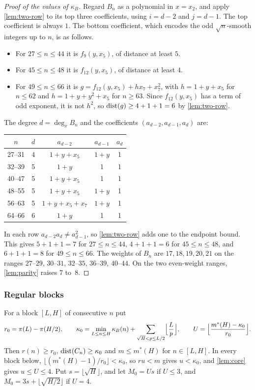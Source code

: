 \begin{proof}[Proof of the values of $\kappa_B$]
Regard $B_n$ as a polynomial in $x=x_2$, and apply \cref{lem:two-row} to its top three coefficients, using $i=d-2$ and $j=d-1$. The top coefficient is always $1$. The bottom coefficient, which encodes the odd $\sqrt n$-smooth integers up to $n$, is as follows.
\begin{itemize}
\item For $27\le n\le44$ it is $f_9(y,x_5)$, of distance at least $5$.
\item For $45\le n\le48$ it is $f_{12}(y,x_5)$, of distance at least $4$.
\item For $49\le n\le66$ it is $g=f_{12}(y,x_5)+hx_7+x_7^2$, with $h=1+y+x_5$ for $n\le62$ and $h=1+y+y^2+x_5$ for $n\ge63$. Since $f_{12}(y,x_5)$ has a term of odd exponent, it is not $h^2$, so $\operatorname{dist}(g)\ge4+1+1=6$ by \cref{lem:two-row}.
\end{itemize}
The degree $d=\deg_xB_n$ and the coefficients $(a_{d-2},a_{d-1},a_d)$ are:

\smallskip
\begin{center}\small
\begin{tabular}{c|c|ccc}
$n$&$d$&$a_{d-2}$&$a_{d-1}$&$a_d$\\\hline
27--31&4&$1+y+x_5$&$1+y$&1\\
32--39&5&$1+y$&1&1\\
40--47&5&$1+y+x_5$&1&1\\
48--55&5&$1+y+x_5$&$1+y$&1\\
56--63&5&$1+y+x_5+x_7$&$1+y$&1\\
64--66&6&$1+y$&1&1
\end{tabular}
\end{center}
\smallskip

In each row $a_{d-2}a_d\ne a_{d-1}^2$, so \cref{lem:two-row} adds one to the endpoint bound. This gives $5+1+1=7$ for $27\le n\le44$, $4+1+1=6$ for $45\le n\le48$, and $6+1+1=8$ for $49\le n\le66$. The weights of $B_n$ are $17,18,19,20,21$ on the ranges $27$--$29$, $30$--$31$, $32$--$35$, $36$--$39$, $40$--$44$. On the two even-weight ranges, \cref{lem:parity} raises $7$ to~$8$.
\end{proof}

\subsubsection*{Regular blocks}
For a block $[L,H]$ of consecutive $n$ put
\[
 r_0=\pi(L)-\pi(H/2),\qquad
 \kappa_0=\min_{L\le n\le H}\kappa_B(n)+\sum_{\sqrt H<p\le L/2}\Bigl\lfloor\frac Lp\Bigr\rfloor,\qquad
 U=\Bigl\lfloor\frac{m^*(H)-\kappa_0}{r_0}\Bigr\rfloor .
\]
Then $r(n)\ge r_0$, $\operatorname{dist}(C_n)\ge\kappa_0$ and $m\le m^*(H)$ for $n\in[L,H]$. In every block below, $\lfloor(m^*(H)-1)/r_0\rfloor<\kappa_0$, so $ru<m$ gives $u<\kappa_0$, and \cref{lem:core} gives $u\le U\le4$. Put $s=\lfloor\sqrt H\rfloor$, and let $M_0=Us$ if $U\le3$, and $M_0=3s+\lfloor\sqrt{H/2}\rfloor$ if $U=4$.

